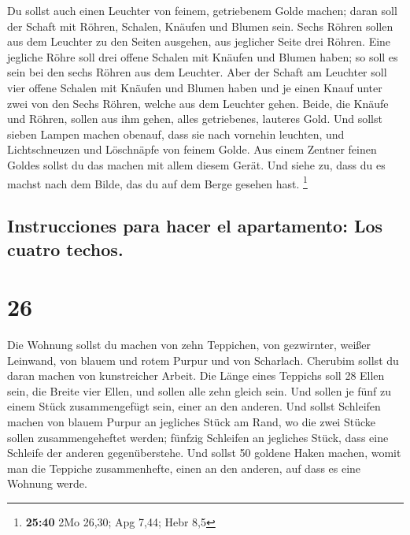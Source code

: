  Du sollst auch einen Leuchter von feinem, getriebenem
Golde machen; daran soll der Schaft mit Röhren, Schalen, Knäufen und
Blumen sein.  Sechs Röhren sollen aus dem Leuchter zu den
Seiten ausgehen, aus jeglicher Seite drei Röhren.  Eine
jegliche Röhre soll drei offene Schalen mit Knäufen und Blumen haben; so
soll es sein bei den sechs Röhren aus dem Leuchter.  Aber
der Schaft am Leuchter soll vier offene Schalen mit Knäufen und Blumen
haben  und je einen Knauf unter zwei von den Sechs
Röhren, welche aus dem Leuchter gehen.  Beide, die Knäufe
und Röhren, sollen aus ihm gehen, alles getriebenes, lauteres Gold.
 Und sollst sieben Lampen machen obenauf, dass sie nach
vornehin leuchten,  und Lichtschneuzen und Löschnäpfe von
feinem Golde.  Aus einem Zentner feinen Goldes sollst du
das machen mit allem diesem Gerät.  Und siehe zu, dass du
es machst nach dem Bilde, das du auf dem Berge gesehen hast. \footnote{\textbf{25:40}
  2Mo 26,30; Apg 7,44; Hebr 8,5}

\hypertarget{instrucciones-para-hacer-el-apartamento-los-cuatro-techos.}{%
\subsection{Instrucciones para hacer el apartamento: Los cuatro
techos.}\label{instrucciones-para-hacer-el-apartamento-los-cuatro-techos.}}

\hypertarget{section-25}{%
\section{26}\label{section-25}}

 Die Wohnung sollst du machen von zehn Teppichen, von
gezwirnter, weißer Leinwand, von blauem und rotem Purpur und von
Scharlach. Cherubim sollst du daran machen von kunstreicher Arbeit.
 Die Länge eines Teppichs soll 28 Ellen sein, die Breite
vier Ellen, und sollen alle zehn gleich sein.  Und sollen
je fünf zu einem Stück zusammengefügt sein, einer an den anderen.
 Und sollst Schleifen machen von blauem Purpur an
jegliches Stück am Rand, wo die zwei Stücke sollen zusammengeheftet
werden;  fünfzig Schleifen an jegliches Stück, dass eine
Schleife der anderen gegenüberstehe.  Und sollst 50
goldene Haken machen, womit man die Teppiche zusammenhefte, einen an den
anderen, auf dass es eine Wohnung werde.

